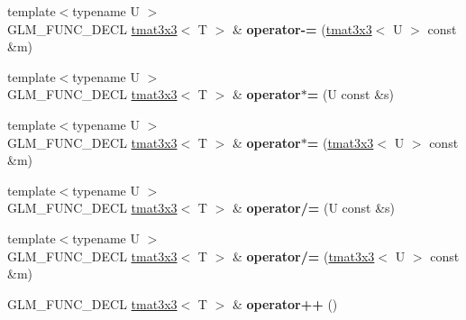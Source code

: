 \begin{DoxyCompactItemize}
\item 
\hypertarget{structglm_1_1detail_1_1tmat3x3_a960ac7281deaadb7e51cd68e4b3ed2ed}{}{\footnotesize template$<$typename U $>$ }\\G\+L\+M\+\_\+\+F\+U\+N\+C\+\_\+\+D\+E\+C\+L \hyperlink{structglm_1_1detail_1_1tmat3x3}{tmat3x3}$<$ T $>$ \& {\bfseries operator-\/=} (\hyperlink{structglm_1_1detail_1_1tmat3x3}{tmat3x3}$<$ U $>$ const \&m)\label{structglm_1_1detail_1_1tmat3x3_a960ac7281deaadb7e51cd68e4b3ed2ed}

\item 
\hypertarget{structglm_1_1detail_1_1tmat3x3_a5e74ec2035c45d8fffc0080798f1a07d}{}{\footnotesize template$<$typename U $>$ }\\G\+L\+M\+\_\+\+F\+U\+N\+C\+\_\+\+D\+E\+C\+L \hyperlink{structglm_1_1detail_1_1tmat3x3}{tmat3x3}$<$ T $>$ \& {\bfseries operator$\ast$=} (U const \&s)\label{structglm_1_1detail_1_1tmat3x3_a5e74ec2035c45d8fffc0080798f1a07d}

\item 
\hypertarget{structglm_1_1detail_1_1tmat3x3_ae9054662de0139020d24b73795f7b336}{}{\footnotesize template$<$typename U $>$ }\\G\+L\+M\+\_\+\+F\+U\+N\+C\+\_\+\+D\+E\+C\+L \hyperlink{structglm_1_1detail_1_1tmat3x3}{tmat3x3}$<$ T $>$ \& {\bfseries operator$\ast$=} (\hyperlink{structglm_1_1detail_1_1tmat3x3}{tmat3x3}$<$ U $>$ const \&m)\label{structglm_1_1detail_1_1tmat3x3_ae9054662de0139020d24b73795f7b336}

\item 
\hypertarget{structglm_1_1detail_1_1tmat3x3_a2bf8199d23a291f1fde6ca5424a34562}{}{\footnotesize template$<$typename U $>$ }\\G\+L\+M\+\_\+\+F\+U\+N\+C\+\_\+\+D\+E\+C\+L \hyperlink{structglm_1_1detail_1_1tmat3x3}{tmat3x3}$<$ T $>$ \& {\bfseries operator/=} (U const \&s)\label{structglm_1_1detail_1_1tmat3x3_a2bf8199d23a291f1fde6ca5424a34562}

\item 
\hypertarget{structglm_1_1detail_1_1tmat3x3_a6c534e0919d17f91d6f5476afd628f0f}{}{\footnotesize template$<$typename U $>$ }\\G\+L\+M\+\_\+\+F\+U\+N\+C\+\_\+\+D\+E\+C\+L \hyperlink{structglm_1_1detail_1_1tmat3x3}{tmat3x3}$<$ T $>$ \& {\bfseries operator/=} (\hyperlink{structglm_1_1detail_1_1tmat3x3}{tmat3x3}$<$ U $>$ const \&m)\label{structglm_1_1detail_1_1tmat3x3_a6c534e0919d17f91d6f5476afd628f0f}

\item 
\hypertarget{structglm_1_1detail_1_1tmat3x3_acf26b11d8dfb7f353ab769152797ae65}{}G\+L\+M\+\_\+\+F\+U\+N\+C\+\_\+\+D\+E\+C\+L \hyperlink{structglm_1_1detail_1_1tmat3x3}{tmat3x3}$<$ T $>$ \& {\bfseries operator++} ()\label{structglm_1_1detail_1_1tmat3x3_acf26b11d8dfb7f353ab769152797ae65}


\end{DoxyCompactItemize}
